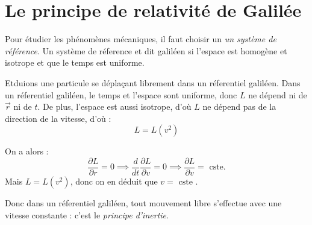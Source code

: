 \section{Le principe de relativité de Galilée}

\begin{definition}
    Pour étudier les phénomènes mécaniques, il faut choisir un \textit{un système de référence}. Un système de réference et dit galiléen si l'espace est homogène et isotrope et que le temps est uniforme.
\end{definition}

\begin{theorem}
    Etduions une particule se déplaçant librement dans un réferentiel galiléen. Dans un réferentiel galiléen, le temps et l'espace sont uniforme, donc \(L\) ne dépend ni de \(\vec{r}\) ni de \(t\). De plus, l'espace est aussi isotrope, d'où \(L\) ne dépend pas de la direction de la vitesse, d'où : 
    \begin{equation}
        L = L(v^{2})
    \end{equation}  
\end{theorem}
\newpage
\begin{corollary}
    On a alors :
    \[
        \frac{\partial L}{\partial r} = 0 \implies  \frac{d}{dt}\frac{\partial L}{\partial v} = 0 \implies \frac{\partial L}{\partial v} = \text{ cste}.
    \]
    Mais \(L = L(v^{2})\), donc on en déduit que \(v = \text{ cste } \). \par
    Donc dans un réferentiel galiléen, tout mouvement libre s'effectue avec une vitesse constante : c'est le \textit{principe d'inertie}. 
\end{corollary}